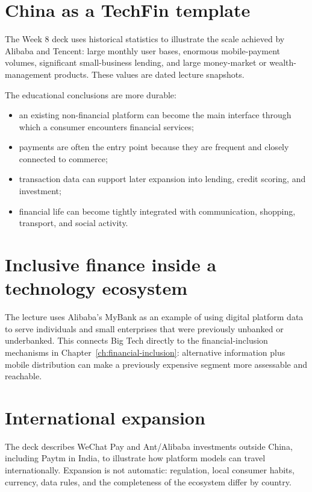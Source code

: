 \section{China as a TechFin template}

The Week 8 deck uses historical statistics to illustrate the scale achieved by Alibaba and Tencent: large monthly user bases, enormous mobile-payment volumes, significant small-business lending, and large money-market or wealth-management products. These values are dated lecture snapshots.

The educational conclusions are more durable:

\begin{itemize}
  \item an existing non-financial platform can become the main interface through which a consumer encounters financial services;
  \item payments are often the entry point because they are frequent and closely connected to commerce;
  \item transaction data can support later expansion into lending, credit scoring, and investment;
  \item financial life can become tightly integrated with communication, shopping, transport, and social activity.
\end{itemize}

\section{Inclusive finance inside a technology ecosystem}

The lecture uses Alibaba's MyBank as an example of using digital platform data to serve individuals and small enterprises that were previously unbanked or underbanked. This connects Big Tech directly to the financial-inclusion mechanisms in Chapter~\ref{ch:financial-inclusion}: alternative information plus mobile distribution can make a previously expensive segment more assessable and reachable.

\section{International expansion}

The deck describes WeChat Pay and Ant/Alibaba investments outside China, including Paytm in India, to illustrate how platform models can travel internationally. Expansion is not automatic: regulation, local consumer habits, currency, data rules, and the completeness of the ecosystem differ by country.

